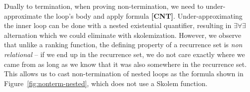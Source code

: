 \documentclass[preprint]{sigplanconf}
\theoremstyle{definition}
\newtheorem{definition}[theorem]{Definition}
\begin{document}
\begin{figure*}
\begin{framed}
 \end{framed}

\end{figure*}

Dually to termination, when proving non-termination, we need to
under-approximate the loop's body and apply formula {\bf [CNT]}.
%
% 
%
%
Under-approximating the inner loop can be done with a nested existential quantifier, resulting in
$\exists \forall \exists$ alternation which we could eliminate with skolemization.  
However, we observe that
unlike a ranking function,
the defining property of a recurrence set is \emph{non relational} -- if we
end up in the recurrence set, we do not care exactly where we came from as
long as we know that it was also somewhere in the recurrence set.  
This allows us to cast non-termination of nested loops as the formula shown in
Figure~\ref{fig:nonterm-nested}, which does not use a Skolem function.
\end{document}
